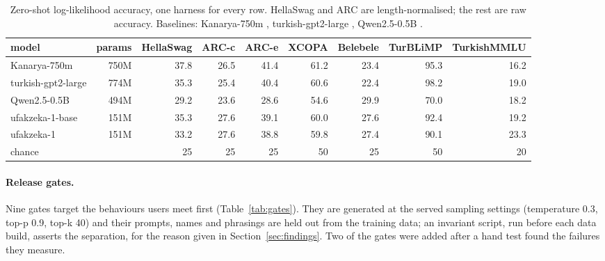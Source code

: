 \documentclass[11pt]{article}
\begin{document}
\begin{table}[t]
\centering\footnotesize\setlength{\tabcolsep}{4pt}
\begin{tabular}{lrrrrrrrr}
\toprule
model & params & HellaSwag & ARC-c & ARC-e & XCOPA & Belebele & TurBLiMP & TurkishMMLU\\
\midrule
Kanarya-750m & 750M & 37.8 & 26.5 & 41.4 & 61.2 & 23.4 & 95.3 & 16.2\\
turkish-gpt2-large & 774M & 35.3 & 25.4 & 40.4 & 60.6 & 22.4 & 98.2 & 19.0\\
Qwen2.5-0.5B & 494M & 29.2 & 23.6 & 28.6 & 54.6 & 29.9 & 70.0 & 18.2\\
ufakzeka-1-base & 151M & 35.3 & 27.6 & 39.1 & 60.0 & 27.6 & 92.4 & 19.2\\
ufakzeka-1 & 151M & 33.2 & 27.6 & 38.8 & 59.8 & 27.4 & 90.1 & 23.3\\
\midrule
chance & & 25 & 25 & 25 & 50 & 25 & 50 & 20\\
\bottomrule
\end{tabular}
\caption{Zero-shot log-likelihood accuracy, one harness for every row. HellaSwag and ARC are length-normalised; the rest are raw accuracy. Baselines: Kanarya-750m \cite{kanarya}, turkish-gpt2-large \cite{cosmosgpt}, Qwen2.5-0.5B \cite{qwen25}.}
\label{tab:bench}
\end{table}

\paragraph{Release gates.} Nine gates target the behaviours users meet first (Table~\ref{tab:gates}). They are generated at the served sampling settings (temperature 0.3, top-p 0.9, top-k 40) and their prompts, names and phrasings are held out from the training data; an invariant script, run before each data build, asserts the separation, for the reason given in Section~\ref{sec:findings}. Two of the gates were added after a hand test found the failures they measure.
\end{document}
